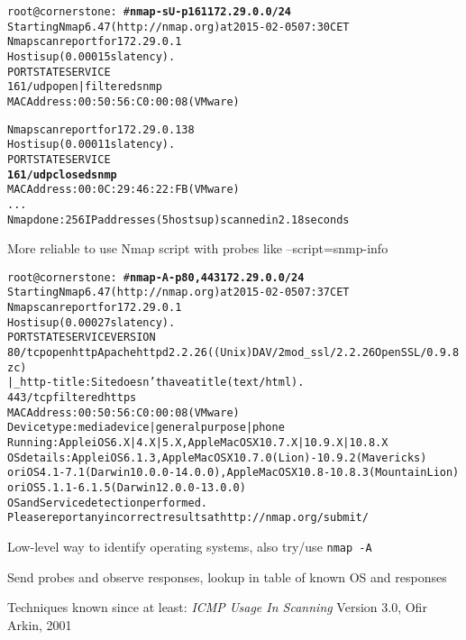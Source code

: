 \documentclass[Screen16to9,17pt]{foils}
\begin{document}

\begin{alltt}\small
root@cornerstone:~#{\bfseries nmap -sU -p 161 172.29.0.0/24}
Starting Nmap 6.47 ( http://nmap.org ) at 2015-02-05 07:30 CET
Nmap scan report for 172.29.0.1
Host is up (0.00015s latency).
PORT    STATE         SERVICE
{\color{darkgreen}161/udp open|filtered snmp}
MAC Address: 00:50:56:C0:00:08 (VMware)

Nmap scan report for 172.29.0.138
Host is up (0.00011s latency).
PORT    STATE  SERVICE
{\bf{161/udp closed snmp}}
MAC Address: 00:0C:29:46:22:FB (VMware)
...
Nmap done: 256 IP addresses (5 hosts up) scanned in 2.18 seconds
\end{alltt}

\vskip 5mm
\centerline{More reliable to use Nmap script with probes like --script=snmp-info}

\begin{alltt}\footnotesize
root@cornerstone:~#{\bfseries nmap -A -p80,443 172.29.0.0/24}
Starting Nmap 6.47 ( http://nmap.org ) at 2015-02-05 07:37 CET
Nmap scan report for 172.29.0.1
Host is up (0.00027s latency).
PORT    STATE    SERVICE VERSION
80/tcp  open     http    Apache httpd 2.2.26 ((Unix) DAV/2 mod_ssl/2.2.26 OpenSSL/0.9.8zc)
|_http-title: Site doesn't have a title (text/html).
443/tcp filtered https
MAC Address: 00:50:56:C0:00:08 (VMware)
Device type: media device|general purpose|phone
Running: Apple iOS 6.X|4.X|5.X, Apple Mac OS X 10.7.X|10.9.X|10.8.X
OS details: Apple iOS 6.1.3, Apple Mac OS X 10.7.0 (Lion) - 10.9.2 (Mavericks)
or iOS 4.1 - 7.1 (Darwin 10.0.0 - 14.0.0), Apple Mac OS X 10.8 - 10.8.3 (Mountain Lion)
or iOS 5.1.1 - 6.1.5 (Darwin 12.0.0 - 13.0.0)
OS and Service detection performed.
Please report any incorrect results at http://nmap.org/submit/
\end{alltt}

\begin{list2}
\item Low-level way to identify operating systems, also try/use
  \verb+nmap -A+
\item Send probes and observe responses, lookup in table of known OS and responses
\item Techniques known since at least: \emph{ICMP Usage In Scanning} Version 3.0,
  Ofir Arkin, 2001 %
\end{list2}
\end{document}
